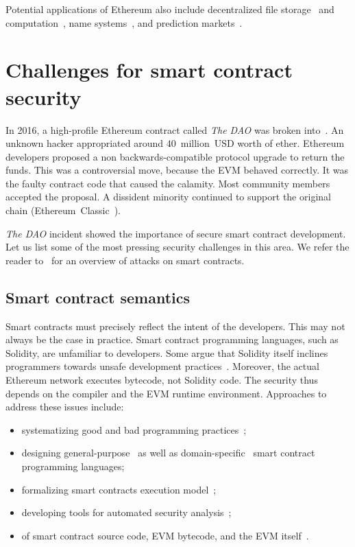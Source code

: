 Potential applications of Ethereum also include decentralized file storage~\cite{Storj} and computation~\cite{Golem}, name systems~\cite{ENS}, and prediction markets~\cite{Augur, Gnosis}.


\section{Challenges for smart contract security}

In 2016, a high-profile Ethereum contract called \textit{The DAO} was broken into~\cite{Sirer2016}.
An unknown hacker appropriated around $40$~million~USD worth of ether.
Ethereum developers proposed a non backwards-compatible protocol upgrade to return the funds.
This was a controversial move, because the EVM behaved correctly.
It was the faulty contract code that caused the calamity.
Most community members accepted the proposal.
A dissident minority continued to support the original chain (Ethereum~Classic~\cite{EthereumClassic}).

\textit{The DAO} incident showed the importance of secure smart contract development.
Let us list some of the most pressing security challenges in this area.
We refer the reader to~\cite{Delmolino2016, Atzei2017} for an overview of attacks on smart contracts.

\subsection{Smart contract semantics}
Smart contracts must precisely reflect the intent of the developers.
This may not always be the case in practice.
Smart contract programming languages, such as Solidity, are unfamiliar to developers.
Some argue that Solidity itself inclines programmers towards unsafe development practices~\cite{ydtm2016}.
Moreover, the actual Ethereum network executes bytecode, not Solidity code.
The security thus depends on the compiler and the EVM runtime environment.
Approaches to address these issues include:
\begin{itemize}
	\item systematizing good and bad programming practices~\cite{ConsenSys16, Chen2017};
	\item designing general-purpose~\cite{Hirai2017a, Buterin2017b, Pettersson2016} as well as domain-specific~\cite{Biryukov2017, EgelundMueller2017} smart contract programming languages;
	\item formalizing smart contracts execution model~\cite{Sergey2017};
	\item developing tools for automated security analysis~\cite{Luu2016a, Tsankov2018};
	\item of smart contract source code, EVM bytecode, and the EVM itself~\cite{Bhargavan2016, Hirai2017}.
\end{itemize}

